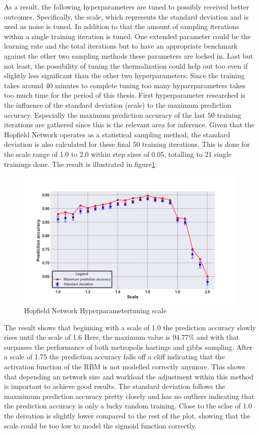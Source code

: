 As a result, the following hyperparameters are tuned to possibly received better outcomes. 
Specifically, the scale, which represents the standard deviation and is used as noise is tuned. 
In addition to that the amount of sampling iterations within a single training iteration is tuned.
One extended parameter could be the learning rate and the total iterations but to have an appropriate benchmark against the other two 
sampling methods these parameters are locked in. 
Last but not least, the possibility of tuning the thermalization could help out too even if slightly less significant than the other two hyperparameters.
Since the training takes around 40 minutes to complete tuning too many hypaerparameters takes too much time for the period of this thesis. 
First hyperparameter researched is the influence of the standard deviation (scale) to the maximum prediction accuracy. 
Especially the maximum prediction accuracy of the last 50 training iterations are gathered since this is the relevant area for inference.
Given that the Hopfield Network operates as a statistical sampling method, the standard deviation is also calculated for these final 50 training iterations.
This is done for the scale range of 1.0 to 2.0 within step sizes of 0.05, totalling to 21 single trainings done.
The result is illustrated in figure\ref{Hyperparamers_Scale_ohne}:
\begin{figure}[H]
    \centering
    \includegraphics[width=0.9\linewidth]{graphics/NEW_Scale_Ohne_N2_Half_Pred_Acc.png}
    \caption{Hopfield Network Hyperparametertuning scale}
    \label{Hyperparamers_Scale_ohne}
\end{figure}
The result shows that beginning with a scale of 1.0 the prediction accuracy slowly rises until the scale of 1.6
Here, the maximum value is 94.77\% and with that surpasses the performance of both metropolis hastings and gibbs sampling. 
After a scale of 1.75 the prediction accuracy falls off a cliff indicating that the activation function of the \ac{RBM} is not modelled correctly anymore.
This shows that depending an network size and workload the adjustment within this method is important to achieve good results. 
The standard deviation follows the maxmimum prediction accuracy pretty closely and has no outliers indicating that the prediction accuracy is only a lucky random training.
Close to the sclae of 1.0 the deivation is slightly lower compared to the rest of the plot, showing that the scale could be too low to model the sigmoid function correctly. 


